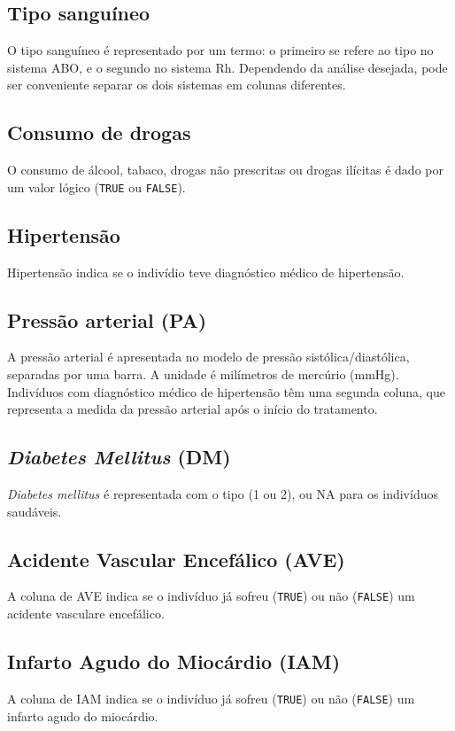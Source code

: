 \documentclass{book}
\begin{document}
\subsection{Tipo sanguíneo}
O tipo sanguíneo é representado por um termo: o primeiro se refere ao tipo no sistema ABO, e o segundo no sistema Rh. Dependendo da análise desejada, pode ser conveniente separar os dois sistemas em colunas diferentes.

\subsection{Consumo de drogas}
O consumo de álcool, tabaco, drogas não prescritas ou drogas ilícitas é dado por um valor lógico (\texttt{TRUE} ou \texttt{FALSE}).

\subsection{Hipertensão}
Hipertensão indica se o indivídio teve diagnóstico médico de hipertensão.

\subsection{Pressão arterial (PA)}
A pressão arterial é apresentada no modelo de pressão sistólica/diastólica, separadas por uma barra. A unidade é milímetros de mercúrio (mmHg). Indivíduos com diagnóstico médico de hipertensão têm uma segunda coluna, que representa a medida da pressão arterial após o início do tratamento.

\subsection{\textit{Diabetes Mellitus} (DM)}
\textit{Diabetes mellitus} é representada com o tipo (1 ou 2), ou NA para os indivíduos saudáveis.

\subsection{Acidente Vascular Encefálico (AVE)}
A coluna de AVE indica se o indivíduo já sofreu (\texttt{TRUE}) ou não (\texttt{FALSE}) um acidente vasculare encefálico.

\subsection{Infarto Agudo do Miocárdio (IAM)}
A coluna de IAM indica se o indivíduo já sofreu (\texttt{TRUE}) ou não (\texttt{FALSE}) um infarto agudo do miocárdio.
\end{document}
